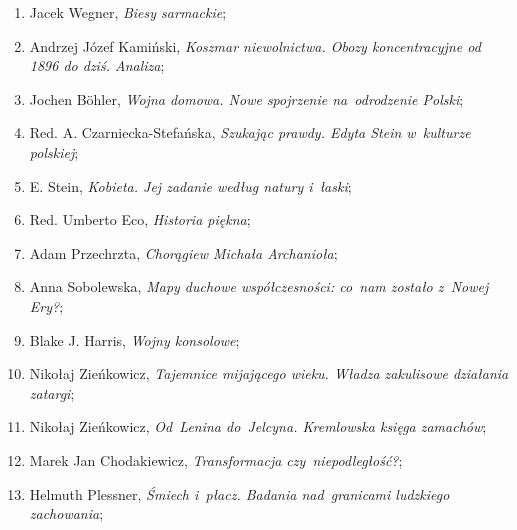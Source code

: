 \documentclass[a4paper,11pt]{article}
\begin{document}
\begin{enumerate}
\item Jacek Wegner, \textit{Biesy sarmackie};



\item Andrzej Józef Kamiński, \textit{Koszmar niewolnictwa. Obozy
    koncentracyjne od 1896 do dziś. Analiza};



\item Jochen B\"{o}hler, \textit{Wojna domowa. Nowe spojrzenie
    na~odrodzenie Polski};



\item Red. A. Czarniecka-Stefańska, \textit{Szukając prawdy. Edyta Stein
    w~kulturze polskiej};



\item E. Stein, \textit{Kobieta. Jej zadanie według natury i~łaski};



\item Red. Umberto Eco, \textit{Historia piękna};



\item Adam Przechrzta, \textit{Chorągiew Michała Archanioła};



\item Anna Sobolewska, \textit{Mapy duchowe współczesności: co~nam
    zostało z~Nowej Ery?};



\item Blake J. Harris, \textit{Wojny konsolowe};



\item Nikołaj Zieńkowicz, \textit{Tajemnice mijającego wieku. Władza
    zakulisowe działania zatargi};



\item Nikołaj Zieńkowicz, \textit{Od~Lenina do~Jelcyna. Kremlowska
    księga zamachów};



\item Marek Jan Chodakiewicz, \textit{Transformacja czy~niepodległość?};



\item Helmuth Plessner, \textit{Śmiech i~płacz. Badania nad~granicami
    ludzkiego zachowania};




\end{enumerate}
\end{document}
